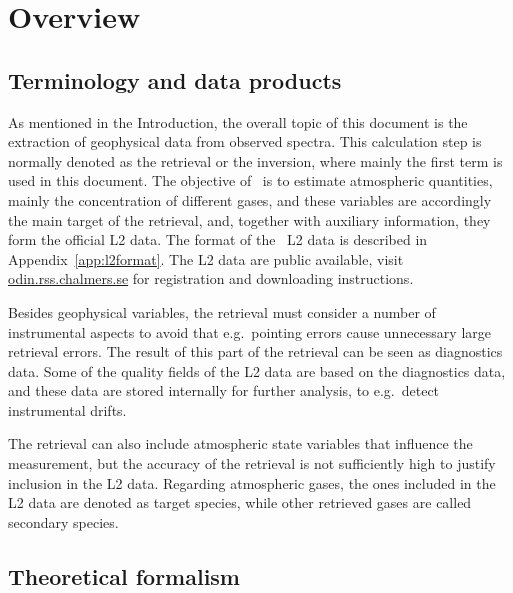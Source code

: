 \chapter{Overview}
\label{chapter:overview}


\section{Terminology and data products}
\label{sec:terminology}
%
As mentioned in the Introduction, the overall topic of this document is the
extraction of geophysical data from observed spectra. This calculation step is
normally denoted as the retrieval or the inversion, where mainly the first term
is used in this document. The objective of \smr\ is to estimate atmospheric
quantities, mainly the concentration of different gases, and these variables
are accordingly the main target of the retrieval, and, together with auxiliary
information, they form the official L2 data. The format of the \smr\ L2 data is
described in Appendix~\ref{app:l2format}. The L2 data are public available,
visit \url{odin.rss.chalmers.se} for registration and downloading instructions.

Besides geophysical variables, the retrieval must consider a number of
instrumental aspects to avoid that e.g.\ pointing errors cause unnecessary
large retrieval errors. The result of this part of the retrieval can be seen as
diagnostics data. Some of the quality fields of the L2 data are based on the
diagnostics data, and these data are stored internally for further analysis, to
e.g.\ detect instrumental drifts. 

The retrieval can also include atmospheric state variables that influence the
measurement, but the accuracy of the retrieval is not sufficiently high to
justify inclusion in the L2 data. Regarding atmospheric gases, the ones
included in the L2 data are denoted as target species, while other retrieved
gases are called secondary species.



\section{Theoretical formalism}
\label{sec:formalism}

